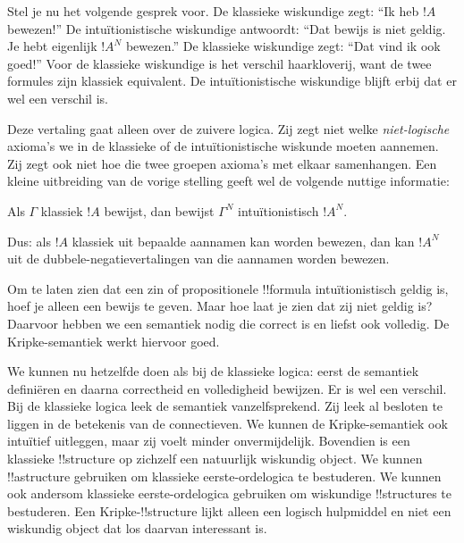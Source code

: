 \documentclass[../../../include/open-logic-section]{subfiles}
\begin{document}
Stel je nu het volgende gesprek voor. De klassieke wiskundige zegt: ``Ik heb
$!A$ bewezen!'' De intuïtionistische wiskundige antwoordt: ``Dat bewijs is niet
geldig. Je hebt eigenlijk $!A^N$ bewezen.'' De klassieke wiskundige zegt: ``Dat
vind ik ook goed!'' Voor de klassieke wiskundige is het verschil haarkloverij,
want de twee formules zijn klassiek equivalent. De intuïtionistische wiskundige
blijft erbij dat er wel een verschil is.

Deze vertaling gaat alleen over de zuivere logica. Zij zegt niet welke
\emph{niet-logische} axioma's we in de klassieke of de intuïtionistische
wiskunde moeten aannemen. Zij zegt ook niet hoe die twee groepen axioma's met
elkaar samenhangen. Een kleine uitbreiding van de vorige stelling geeft wel de
volgende nuttige informatie:

\begin{thm}
Als $\Gamma$ klassiek $!A$ bewijst, dan bewijst $\Gamma^N$
intuïtionistisch $!A^N$.
\end{thm}

Dus: als $!A$ klassiek uit bepaalde aannamen kan worden bewezen, dan kan
$!A^N$ uit de dubbele-negatievertalingen van die aannamen worden bewezen.

Om te laten zien dat een zin of propositionele !!{formula} intuïtionistisch
geldig is, hoef je alleen een bewijs te geven. Maar hoe laat je zien dat zij niet
geldig is? Daarvoor hebben we een semantiek nodig die correct is en liefst ook
volledig. De Kripke-semantiek werkt hiervoor goed.

We kunnen nu hetzelfde doen als bij de klassieke logica: eerst de semantiek
definiëren en daarna correctheid en volledigheid bewijzen. Er is wel een verschil.
Bij de klassieke logica leek de semantiek vanzelfsprekend. Zij leek al besloten
te liggen in de betekenis van de connectieven. We kunnen de Kripke-semantiek ook
intuïtief uitleggen, maar zij voelt minder onvermijdelijk. Bovendien is een
klassieke !!{structure} op zichzelf een natuurlijk wiskundig object. We kunnen
!!a{structure} gebruiken om klassieke eerste-ordelogica te bestuderen. We kunnen
ook andersom klassieke eerste-ordelogica gebruiken om wiskundige !!{structure}s
te bestuderen. Een Kripke-!!{structure} lijkt alleen een logisch hulpmiddel en
niet een wiskundig object dat los daarvan interessant is.
\end{document}
